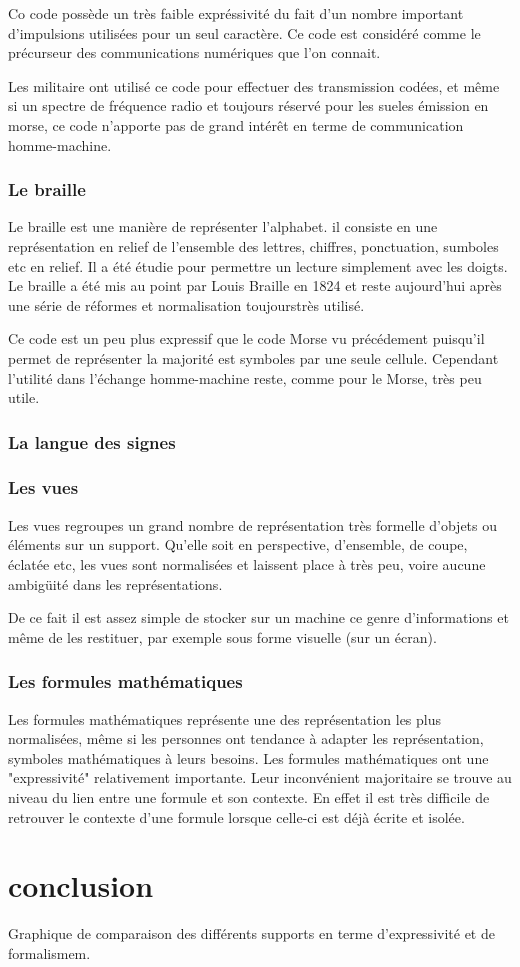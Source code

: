 \documentclass[french,a4paper]{article}
\begin{document}
Co code possède un très faible expréssivité du fait d'un nombre important d'impulsions utilisées pour un seul caractère.
Ce code est considéré comme le précurseur des communications numériques que l'on connait.

Les militaire ont utilisé ce code pour effectuer des transmission codées, et même si un spectre de fréquence radio et toujours 
réservé pour les sueles émission en morse, ce code n'apporte pas de grand intérêt en terme de communication homme-machine.

\subsubsection{Le braille}
Le braille est une manière de représenter l'alphabet. il consiste en une représentation en relief de l'ensemble des lettres, chiffres, ponctuation, sumboles etc
en relief. Il a été étudie pour permettre un lecture simplement avec les doigts. Le braille a été mis au point par Louis Braille en 1824 et 
reste aujourd'hui après une série de réformes et normalisation toujourstrès utilisé.

Ce code est un peu plus expressif que le code Morse vu précédement puisqu'il permet de représenter la majorité est symboles par
une seule cellule. Cependant l'utilité dans l'échange homme-machine reste, comme pour le Morse, très peu utile.


\subsubsection{La langue des signes}

\subsubsection{Les vues}
Les vues regroupes un grand nombre de représentation très formelle d'objets ou éléments sur un support. Qu'elle soit
en perspective, d'ensemble, de coupe, éclatée etc, les vues sont normalisées et laissent place à très peu, voire aucune ambigüité dans les
représentations.

De ce fait il est assez simple de stocker sur un machine ce genre d'informations et même de les restituer, par exemple sous
forme visuelle (sur un écran).

\subsubsection{Les formules mathématiques}
Les formules mathématiques représente une des représentation les plus normalisées, même si les personnes ont tendance à 
adapter les représentation, symboles mathématiques à leurs besoins.
Les formules mathématiques ont une "expressivité" relativement importante. Leur inconvénient majoritaire se trouve au niveau 
du lien entre une formule et son contexte.
En effet il est très difficile de retrouver le contexte d'une formule lorsque celle-ci est déjà écrite et isolée.


\section{conclusion}
Graphique de comparaison des différents supports en terme d'expressivité et de formalismem.
\end{document}
